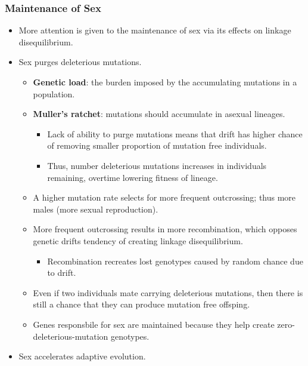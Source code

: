 \documentclass[12pt,a4paper]{article}
\begin{document}
\begin{itemize}
    \subsubsection{Maintenance of Sex}
    \begin{itemize}
        \item More attention is given to the maintenance of sex via its effects on linkage disequilibrium. 
        \item Sex {\color{o-Sun}purges deleterious mutations}.
            \begin{itemize}
                \item \textbf{Genetic load}: the burden imposed by the accumulating mutations in a population.
                \item \textbf{Muller's ratchet}: mutations should accumulate in asexual lineages.
                    \begin{itemize}
                        \item Lack of ability to purge mutations means that drift has higher chance of removing smaller proportion of mutation free individuals.
                        \item Thus, number deleterious mutations increases in individuals remaining, overtime lowering fitness of lineage. 
                    \end{itemize}
                \item A higher mutation rate selects for more frequent outcrossing; thus more males (more sexual reproduction).
                \item More frequent outcrossing results in more recombination, which opposes genetic drifts tendency of creating linkage disequilibrium.
                    \begin{itemize}
                        \item Recombination recreates lost genotypes caused by random chance due to drift.
                    \end{itemize}
                \item Even if two individuals mate carrying deleterious mutations, then there is still a chance that they can produce mutation free offsping.
                \item Genes responsbile for sex are maintained because they help create zero-deleterious-mutation genotypes. 
            \end{itemize}
        \item Sex {\color{o-Sun}accelerates adaptive evolution}.
            \begin{itemize}

\end{itemize}
\end{itemize}
\end{itemize}
\end{document}
